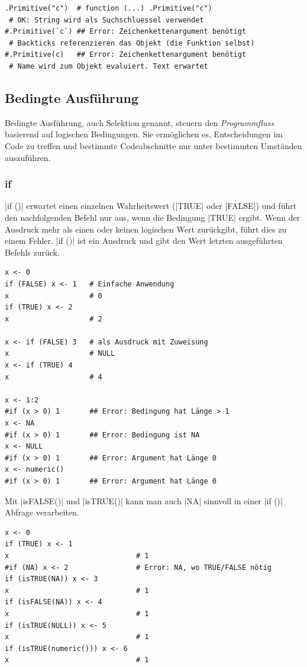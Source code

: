 \documentclass[10pt,twocolumn]{scrartcl}
\renewcommand{\lstinline}{\mycoloredinline}
\begin{document}
\begin{lstlisting}
.Primitive("c")  # function (...) .Primitive("c")
 # OK: String wird als Suchschluessel verwendet
#.Primitive(`c`) ## Error: Zeichenkettenargument benötigt
 # Backticks referenzieren das Objekt (die Funktion selbst) 
#.Primitive(c)   ## Error: Zeichenkettenargument benötigt
 # Name wird zum Objekt evaluiert. Text erwartet
\end{lstlisting}


\subsection{Bedingte Ausführung}

Bedingte Ausführung, auch Selektion genannt, steuern den \emph{Programmfluss} basierend auf logischen Bedingungen. Sie ermöglichen es, Entscheidungen im Code zu treffen und bestimmte Codeabschnitte nur unter bestimmten Umständen auszuführen.

\subsubsection{if}

\lstinline|if ()| erwartet einen einzelnen Wahrheitswert (\lstinline|TRUE| oder \lstinline|FALSE|) und führt den nachfolgenden Befehl nur aus, wenn die Bedingung \lstinline|TRUE| ergibt. Wenn der Ausdruck mehr als einen oder keinen logischen Wert zurückgibt, führt dies zu einem Fehler. \lstinline|if ()| ist ein Ausdruck und gibt den Wert letzten ausgeführten Befehls zurück.

\begin{lstlisting}
x <- 0
if (FALSE) x <- 1   # Einfache Anwendung
x                   # 0
if (TRUE) x <- 2
x                   # 2

x <- if (FALSE) 3   # als Ausdruck mit Zuweisung
x                   # NULL
x <- if (TRUE) 4
x                   # 4

x <- 1:2
#if (x > 0) 1       ## Error: Bedingung hat Länge > 1
x <- NA
#if (x > 0) 1       ## Error: Bedingung ist NA
x <- NULL
#if (x > 0) 1       ## Error: Argument hat Länge 0
x <- numeric()
#if (x > 0) 1       ## Error: Argument hat Länge 0
\end{lstlisting}

Mit \lstinline|isFALSE()| und \lstinline|isTRUE()| kann man auch \lstinline|NA| sinnvoll in einer \lstinline|if ()| Abfrage verarbeiten.

\begin{lstlisting}
x <- 0
if (TRUE) x <- 1
x                              # 1
#if (NA) x <- 2                # Error: NA, wo TRUE/FALSE nötig
if (isTRUE(NA)) x <- 3
x                              # 1
if (isFALSE(NA)) x <- 4
x                              # 1
if (isTRUE(NULL)) x <- 5
x                              # 1
if (isTRUE(numeric())) x <- 6
x                              # 1
\end{lstlisting}
\end{document}
